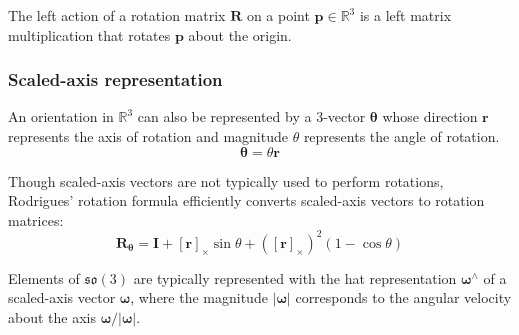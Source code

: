 		The left action of a rotation matrix $\mathbf{R}$ on a point $\mathbf{p} \in \mathbb{R}^3$ is a left matrix multiplication that rotates $\mathbf{p}$ about the origin.
		
		\subsubsection{Scaled-axis representation}
		An orientation in $\mathbb{R}^3$ can also be represented by a 3-vector $\bm{\theta}$ whose direction $\mathbf{r}$ represents the axis of rotation and magnitude $\theta$ represents the angle of rotation.
		\begin{equation}
			\bm{\theta} = \theta\mathbf{r}
		\end{equation}
		
		Though scaled-axis vectors are not typically used to perform rotations, Rodrigues' rotation formula efficiently converts scaled-axis vectors to rotation matrices:
		\begin{equation} \label{eq:rodrigues}
			\mathbf{R}_{\bm{\theta}} = \mathbf{I} + [\mathbf{r}]_{\times}\sin{\theta} + ([\mathbf{r}]_{\times})^2(1-\cos{\theta})
		\end{equation}
					
		Elements of $\mathfrak{so}(3)$ are typically represented with the hat representation $\bm{\omega}^{\wedge}$ of a scaled-axis vector $\bm{\omega}$, where the magnitude $|\bm{\omega}|$ corresponds to the angular velocity about the axis $\bm{\omega}/|\bm{\omega}|$.
					

